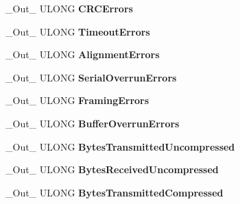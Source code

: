 \begin{DoxyCompactItemize}
\+\_\+\+Out\+\_\+ U\+L\+O\+NG {\bfseries C\+R\+C\+Errors}
\item 
\mbox{\label{struct___n_d_i_s___w_a_n___g_e_t___s_t_a_t_s___i_n_f_o_a26c5eae86a6bd1707425ae039e1e6384}} 
\+\_\+\+Out\+\_\+ U\+L\+O\+NG {\bfseries Timeout\+Errors}
\item 
\mbox{\label{struct___n_d_i_s___w_a_n___g_e_t___s_t_a_t_s___i_n_f_o_a29d67f5dbb35079476605fa3f5aa75db}} 
\+\_\+\+Out\+\_\+ U\+L\+O\+NG {\bfseries Alignment\+Errors}
\item 
\mbox{\label{struct___n_d_i_s___w_a_n___g_e_t___s_t_a_t_s___i_n_f_o_add664d42df0373078746e4aafff04a12}} 
\+\_\+\+Out\+\_\+ U\+L\+O\+NG {\bfseries Serial\+Overrun\+Errors}
\item 
\mbox{\label{struct___n_d_i_s___w_a_n___g_e_t___s_t_a_t_s___i_n_f_o_aad78e6b556210aaf453f149f8a073f61}} 
\+\_\+\+Out\+\_\+ U\+L\+O\+NG {\bfseries Framing\+Errors}
\item 
\mbox{\label{struct___n_d_i_s___w_a_n___g_e_t___s_t_a_t_s___i_n_f_o_a3dc1922836b1cc3e4f052deaf1f41ecc}} 
\+\_\+\+Out\+\_\+ U\+L\+O\+NG {\bfseries Buffer\+Overrun\+Errors}
\item 
\mbox{\label{struct___n_d_i_s___w_a_n___g_e_t___s_t_a_t_s___i_n_f_o_a2464c18dad9b05d5447b32d749ed16b6}} 
\+\_\+\+Out\+\_\+ U\+L\+O\+NG {\bfseries Bytes\+Transmitted\+Uncompressed}
\item 
\mbox{\label{struct___n_d_i_s___w_a_n___g_e_t___s_t_a_t_s___i_n_f_o_a05615e64359187f441f14f86187eb01e}} 
\+\_\+\+Out\+\_\+ U\+L\+O\+NG {\bfseries Bytes\+Received\+Uncompressed}
\item 
\mbox{\label{struct___n_d_i_s___w_a_n___g_e_t___s_t_a_t_s___i_n_f_o_a584a790908a8d988973293573d8761ca}} 
\+\_\+\+Out\+\_\+ U\+L\+O\+NG {\bfseries Bytes\+Transmitted\+Compressed}

\end{DoxyCompactItemize}
